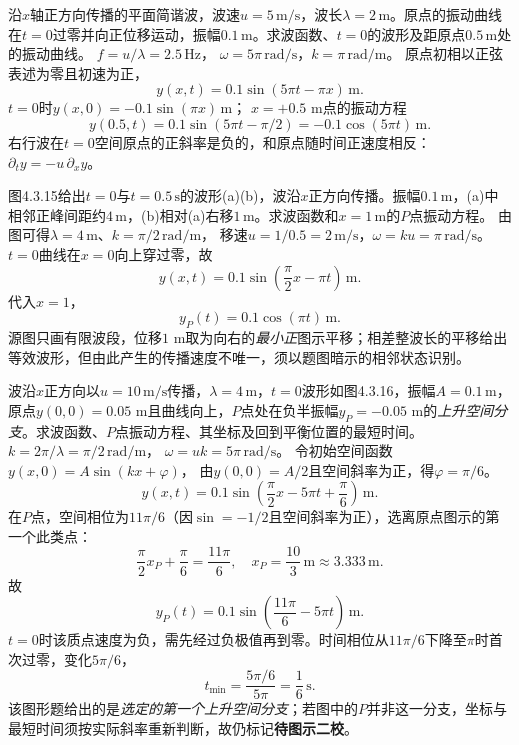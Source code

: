 \problemtext 沿$x$轴正方向传播的平面简谐波，波速$u=5\,\mathrm{m/s}$，波长$\lambda=2\,\mathrm m$。原点的振动曲线在$t=0$过零并向正位移运动，振幅$0.1\,\mathrm m$。求波函数、$t=0$的波形及距原点$0.5\,\mathrm m$处的振动曲线。
\workings
$f=u/\lambda=2.5\,\mathrm{Hz}$，
$\omega=5\pi\,\mathrm{rad/s}$，$k=\pi\,\mathrm{rad/m}$。
原点初相以正弦表述为零且初速为正，
\[
\boxed{y(x,t)=0.1\sin(5\pi t-\pi x)\,\mathrm m}.
\]
$t=0$时$\boxed{y(x,0)=-0.1\sin(\pi x)\,\mathrm m}$；
$x=+0.5$ m点的振动方程
\[
\boxed{y(0.5,t)=0.1\sin(5\pi t-\pi/2)
=-0.1\cos(5\pi t)\,\mathrm m}.
\]
\crosscheck 右行波在$t=0$空间原点的正斜率是负的，和原点随时间正速度相反：
$\partial_ty=-u\,\partial_xy$。

\problemtext 图4.3.15给出$t=0$与$t=0.5\,\mathrm s$的波形(a)(b)，波沿$x$正方向传播。振幅$0.1\,\mathrm m$，(a)中相邻正峰间距约$4\,\mathrm m$，(b)相对(a)右移$1\,\mathrm m$。求波函数和$x=1\,\mathrm m$的$P$点振动方程。
\workings
由图可得$\lambda=4\,\mathrm m$、$k=\pi/2\,\mathrm{rad/m}$，
移速$u=1/0.5=2\,\mathrm{m/s}$，$\omega=ku=\pi\,\mathrm{rad/s}$。
$t=0$曲线在$x=0$向上穿过零，故
\[
\boxed{y(x,t)=0.1\sin\left(\frac\pi2x-\pi t\right)\,\mathrm m}.
\]
代入$x=1$，
\[
\boxed{y_P(t)=0.1\cos(\pi t)\,\mathrm m}.
\]
\crosscheck 源图只画有限波段，位移$1$ m取为向右的\emph{最小正}图示平移；相差整波长的平移给出等效波形，但由此产生的传播速度不唯一，须以题图暗示的相邻状态识别。

\problemtext 波沿$x$正方向以$u=10\,\mathrm{m/s}$传播，$\lambda=4\,\mathrm m$，$t=0$波形如图4.3.16，振幅$A=0.1\,\mathrm m$，原点$y(0,0)=0.05$ m且曲线向上，$P$点处在负半振幅$y_P=-0.05$ m的\emph{上升空间分支}。求波函数、$P$点振动方程、其坐标及回到平衡位置的最短时间。
\workings
$k=2\pi/\lambda=\pi/2\,\mathrm{rad/m}$，
$\omega=uk=5\pi\,\mathrm{rad/s}$。
令初始空间函数$y(x,0)=A\sin(kx+\varphi)$，
由$y(0,0)=A/2$且空间斜率为正，得$\varphi=\pi/6$。
\[
\boxed{y(x,t)=0.1\sin\left(\frac\pi2x-5\pi t+\frac\pi6\right)\,\mathrm m}.
\]
在$P$点，空间相位为$11\pi/6$（因$\sin=-1/2$且空间斜率为正），选离原点图示的第一个此类点：
\[
\frac\pi2x_P+\frac\pi6=\frac{11\pi}{6},
\quad
\boxed{x_P=\frac{10}{3}\,\mathrm m\approx3.333\,\mathrm m}.
\]
故
\[
\boxed{y_P(t)=0.1\sin\left(\frac{11\pi}{6}-5\pi t\right)\,\mathrm m}.
\]
$t=0$时该质点速度为负，需先经过负极值再到零。时间相位从$11\pi/6$下降至$\pi$时首次过零，变化$5\pi/6$，
\[
\boxed{t_{\min}=\frac{5\pi/6}{5\pi}=\frac16\,\mathrm s}.
\]
\crosscheck 该图形题给出的是\emph{选定的第一个上升空间分支}；若图中的$P$并非这一分支，坐标与最短时间须按实际斜率重新判断，故仍标记\textbf{待图示二校}。

